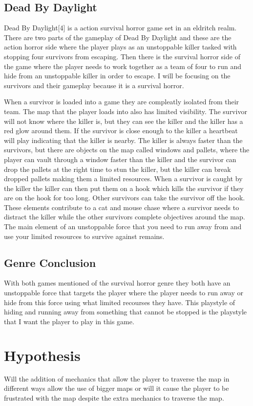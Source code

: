 \documentclass{article}
\begin{document}
\subsection{Dead By Daylight}
Dead By Daylight[4] is a action survival horror game set in an eldritch realm. There are two parts of the gameplay of 
Dead By Daylight and these are the action horror side where the player plays as an unstoppable killer tasked with stopping
four survivors from escaping. Then there is the survival horror side of the game where the player needs to work together
as a team of four to run and hide from an unstoppable killer in order to escape. I will be focusing on the survivors and
their gameplay because it is a survival horror.

When a survivor is loaded into a game they are compleatly isolated from their team. The map that the player loads into 
also has limited visibility. The survivor will not know where the killer is, but they can see the killer and the killer
has a red glow around them. If the survivor is close enough to the killer a heartbeat will play indicating that the killer
is nearby. The killer is always faster than the survivors, but there are objects on the map called windows and pallets, where
the player can vault through a window faster than the killer and the survivor can drop the pallets at the right time to stun
the killer, but the killer can break dropped pallets making them a limited resources. When a survivor is caught by the killer
the killer can then put them on a hook which kills the survivor if they are on the hook for too long. Other survivors can
take the survivor off the hook. These elements contribute to a cat and mouse chase where a survivor needs to distract the
killer while the other survivors complete objectives around the map. The main element of an unstoppable force that you need
to run away from and use your limited resources to survive against remains.


\subsection{Genre Conclusion}
With both games mentioned of the survival horror genre they both have an unstoppable force that targets the player where 
the player needs to run away or hide from this force using what limited recourses they have.
This playstyle of hiding and running away from something that cannot be stopped is the playstyle that I want the player
to play in this game.

\section{Hypothesis}
Will the addition of mechanics that allow the player to traverse the map in different ways
allow the use of bigger maps or will it cause the player to be frustrated with the map despite
the extra mechanics to traverse the map.
\end{document}
